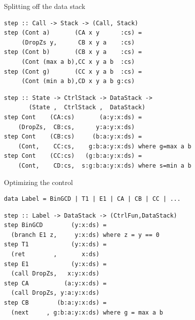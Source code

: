 \documentclass[pdf]{beamer}
\begin{document}
\begin{frame}[fragile]{Splitting off the data stack}
\begin{block}{}
\begin{verbatim}
step :: Call -> Stack -> (Call, Stack)
step (Cont a)       (CA x y      :cs) =
     (DropZs y,      CB x y a    :cs)
step (Cont b)       (CB x y a    :cs) =
     (Cont (max a b),CC x y a b  :cs)
step (Cont g)       (CC x y a b  :cs) =
     (Cont (min a b),CD x y a b g:cs)
\end{verbatim}
\end{block}
\begin{block}{}
\begin{verbatim}
step :: State -> CtrlStack -> DataStack ->
       (State ,  CtrlStack ,  DataStack)
step Cont    (CA:cs)       (a:y:x:ds) = 
    (DropZs,  CB:cs,      y:a:y:x:ds)
step Cont    (CB:cs)     (b:a:y:x:ds) = 
    (Cont,    CC:cs,    g:b:a:y:x:ds) where g=max a b
step Cont    (CC:cs)   (g:b:a:y:x:ds) = 
    (Cont,    CD:cs,  s:g:b:a:y:x:ds) where s=min a b
\end{verbatim}
\end{block}
\end{frame}

\begin{frame}[fragile]{Optimizing the control}
\begin{block}{}
\begin{small}
\begin{verbatim}
data Label = BinGCD | T1 | E1 | CA | CB | CC | ...
\end{verbatim}
\end{small}
\end{block}

\begin{block}{}
\begin{verbatim}
step :: Label -> DataStack -> (CtrlFun,DataStack)
step BinGCD        (y:x:ds) =
  (branch E1 z,     y:x:ds) where z = y == 0
step T1            (y:x:ds) = 
  (ret        ,       x:ds)
step E1            (y:x:ds) = 
  (call DropZs,   x:y:x:ds)
step CA          (a:y:x:ds) = 
  (call DropZs, y:a:y:x:ds)
step CB        (b:a:y:x:ds) = 
  (next     , g:b:a:y:x:ds) where g = max a b
\end{verbatim}
\end{block}

\end{frame}
\end{document}

